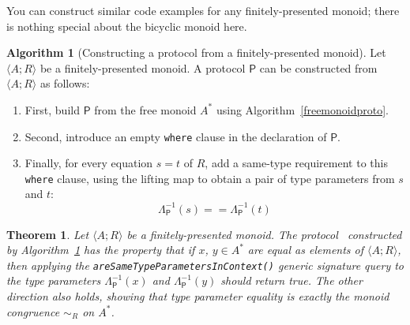 \documentclass[headsepline,bibliography=totoc]{scrreport}
\newcommand{\proto}[1]{\bm{\mathsf{#1}}}
\newtheorem{theorem}{Theorem}[chapter]
\theoremstyle{definition}
\theoremstyle{definition}
\theoremstyle{definition}
\newtheorem{algorithm}{Algorithm}[chapter]
\begin{document}
You can construct similar code examples for any finitely-presented monoid; there is nothing special about the bicyclic monoid here.
\begin{algorithm}[Constructing a protocol from a finitely-presented monoid]\label{protocolmonoidalgo} Let $\langle A;R\rangle$ be a finitely-presented monoid. A protocol $\proto{P}$ can be constructed from $\langle A;R\rangle$ as follows:
\begin{enumerate}
\item First, build $\proto{P}$ from the free monoid $A^*$ using Algorithm~\ref{freemonoidproto}.
\item Second, introduce an empty \texttt{where} clause in the declaration of $\proto{P}$.
\item Finally, for every equation $s=t$ of $R$, add a same-type requirement to this \texttt{where} clause, using the lifting map to obtain a pair of type parameters from $s$ and $t$:
\[\Lambda_{\proto{P}}^{-1}(s)==\Lambda_{\proto{P}}^{-1}(t)\]
\end{enumerate}
\end{algorithm}
\begin{theorem}\label{protocolmonoidthm} Let $\langle A;R\rangle$ be a finitely-presented monoid. The protocol~\proto{P} constructed by Algorithm~\ref{protocolmonoidalgo} has the property that if $x$, $y \in A^*$ are equal as elements of $\langle A;R\rangle$, then applying the \texttt{areSameTypeParametersInContext()} generic signature query to the type parameters $\Lambda_{\proto{P}}^{-1}(x)$ and $\Lambda_{\proto{P}}^{-1}(y)$ should return true. The other direction also holds, showing that type parameter equality is exactly the monoid congruence $\sim_R$ on $A^*$.
\end{theorem}
\end{document}
